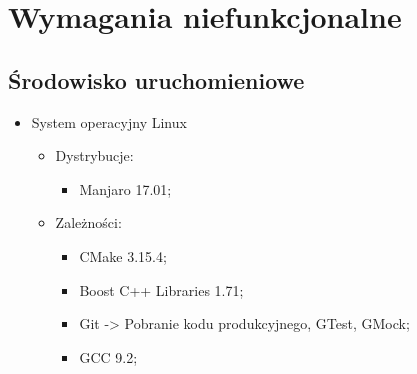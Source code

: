 \chapter{Wymagania niefunkcjonalne}
\section{Środowisko uruchomieniowe}
	\begin{itemize}
		\item System operacyjny Linux
			\begin{itemize}
				\item Dystrybucje:
				\begin{itemize}
					\item Manjaro 17.01;
				\end{itemize}
				\item Zależności:
					\begin{itemize}
						\item CMake 3.15.4;
						\item Boost C++ Libraries 1.71;
						\item Git -> Pobranie kodu produkcyjnego, GTest, GMock;
						\item GCC 9.2;
					\end{itemize}
			\end{itemize}
	\end{itemize}
